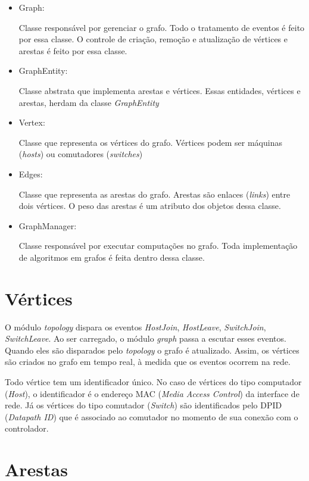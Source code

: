 \begin{itemize}
    \item{Graph}: 
        
        Classe responsável por gerenciar o grafo.
        Todo o tratamento de eventos é feito por essa classe.
        O controle de criação, remoção e atualização de vértices e arestas 
        é feito por essa classe.
    \item{GraphEntity}: 
        
        Classe abstrata que implementa arestas e vértices.
        Essas entidades, vértices e arestas, herdam da classe 
        \emph{GraphEntity}
    \item{Vertex}: 
        
        Classe que representa os vértices do grafo.
        Vértices podem ser máquinas (\emph{hosts}) ou comutadores
        (\emph{switches})
    \item{Edges}: 
        
        Classe que representa as arestas do grafo.
        Arestas são enlaces (\emph{links}) entre dois vértices.
        O peso das arestas é um atributo dos objetos dessa classe.
    \item{GraphManager}: 
        
        Classe responsável por executar computações no grafo.
        Toda implementação de algoritmos em grafos é feita dentro dessa classe.
\end{itemize}

\section{Vértices}

O módulo \emph{topology} dispara os eventos \emph{HostJoin}, \emph{HostLeave},
\emph{SwitchJoin}, \emph{SwitchLeave}.
Ao ser carregado, o módulo \emph{graph} passa a escutar esses eventos.
Quando eles são disparados pelo \emph{topology} o grafo é atualizado.
Assim, os vértices são criados no grafo em tempo real, à medida que os
eventos ocorrem na rede.

Todo vértice tem um identificador único.
No caso de vértices do tipo computador (\emph{Host}), o identificador 
é o endereço MAC (\emph{Media Access Control}) da interface de rede.
Já os vértices do tipo comutador (\emph{Switch}) são identificados pelo 
DPID (\emph{Datapath ID}) que é associado ao comutador no momento de sua 
conexão com o controlador.

\section{Arestas}

